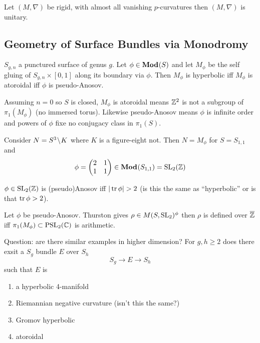\documentclass[12pt]{article}
\begin{document}
\begin{theorem}[EG, '20]
Let $(M, \nabla)$ be rigid, with almost all vanishing $p$-curvatures then $(M, \nabla)$ is unitary. 
\end{theorem}

\subsection{Geometry of Surface Bundles via Monodromy}

\begin{theorem}[Thurston]
$S_{g,n}$ a punctured surface of genus $g$. Let $\phi \in \mathbf{Mod}_{}(S)$ and let $M_\phi$ be the self gluing of $S_{g,n} \times [0,1]$ along its boundary via $\phi$. Then $M_\phi$ is hyperbolic iff $M_\phi$ is atoroidal iff $\phi$ is pseudo-Anosov.
\end{theorem}

\begin{rmk}
Assuming $n = 0$ so $S$ is closed, $M_\phi$ is atoroidal means $\mathbb{Z}^2$ is not a subgroup of $\pi_1(M_\phi)$ (no immersed torus). Likewise pseudo-Anosov means $\phi$ is infinite order and powers of $\phi$ fixe no conjugacy class in $\pi_1(S)$.
\end{rmk}

\begin{example}
Consider $N = S^3 \! \setminus \! K$ where $K$ is a figure-eight not. Then $N = M_\phi$ for $S = S_{1,1}$ and 
\[ \phi = 
\begin{pmatrix}
2 & 1
\\
1 & 1
\end{pmatrix} 
\in \mathbf{Mod}_{}(S_{1,1}) = \mathrm{SL}_2(\mathbb{Z}) \]
\end{example}

\begin{example}
$\phi \in \mathrm{SL}_2(\mathbb{Z})$ is (pseudo)Anosov iff $|\operatorname{\mathrm{tr}}{\phi}| > 2$ (is this the same as ``hyperbolic'' or is that $\operatorname{\mathrm{tr}}{\phi} > 2$). 
\end{example}

\begin{rmk}
Let $\phi$ be pseudo-Anosov. Thurston gives $\rho \in M(S, \mathrm{SL}_2)^{\phi}$ then $\rho$ is defined over $\overline{\mathbb{Z}}$ iff $\pi_1(M_\phi) \subset \mathrm{PSL}_2(\mathbb{C})$ is arithmetic. 
\end{rmk}

Question: are there similar examples in higher dimension? For $g,h \ge 2$ does there exsit a $S_g$ bundle $E$ over $S_h$
\[ S_g \to E \to S_h \]
such that $E$ is
\begin{enumerate}
\item a hyperbolic 4-manifold
\item Riemannian negative curvature (isn't this the same?)
\item Gromov hyperbolic
\item atoroidal
\end{enumerate}
\end{document}
